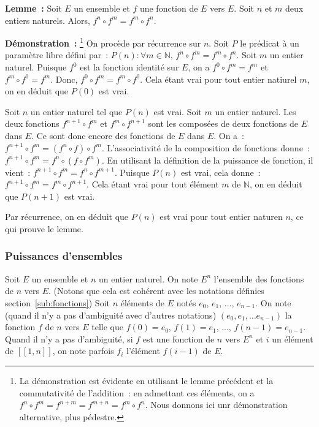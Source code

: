    \done 

\medskip

\noindent\textbf{Lemme :} 
    Soit $E$ un ensemble et $f$ une fonction de $E$ vers $E$.
    Soit $n$ et $m$ deux entiers naturels. 
    Alors, $f^n \circ f^m = f^m \circ f^n$.

\medskip

\noindent\textbf{Démonstration :}%
    \footnote{La démonstration est évidente en utilisant le lemme précédent et la commutativité de l'addition : en admettant ces éléments, on a $f^n \circ f^m = f^{n+m} = f^{m+n} = f^m \circ f^n$.
    Nous donnons ici unr démonstration alternative, plus pédestre.}
    On procède par récurrence sur $n$.
    Soit $P$ le prédicat à un paramètre libre défini par : $P(n): \forall m \in \mathbb{N}, \, f^n \circ f^m = f^m \circ f^n$. 
    Soit $m$ un entier naturel. 
    Puisque $f^0$ est la fonction identité sur $E$, on a $f^0 \circ f^m = f^m$ et $f^m \circ f^0 = f^m$.
    Donc, $f^0 \circ f^m = f^m \circ f^0$. 
    Cela étant vrai pour tout entier natiurel $m$, on en déduit que $P(0)$ est vrai.

    Soit $n$ un entier naturel tel que $P(n)$ est vrai. 
    Soit $m$ un entier naturel. 
    Les deux fonctions $f^{n+1} \circ f^m$ et $f^m \circ f^{n+1}$ sont les composées de deux fonctions de $E$ dans $E$. 
    Ce sont donc encore des fonctions de $E$ dans $E$. 
    On a : $f^{n+1} \circ f^m = (f^n \circ f) \circ f^m$.
    L'associativité de la composition de fonctions donne : $f^{n+1} \circ f^m = f^n \circ (f \circ f^m)$.
    En utilisant la définition de la puissance de fonction, il vient : $f^{n+1} \circ f^m = f^n \circ f^{m+1}$.
    Puisque $P(n)$ est vrai, cela donne : $f^{n+1} \circ f^m = f^m \circ f^{n+1}$. 
    Cela étant vrai pour tout élément $m$ de $\mathbb{N}$, on en déduit que $P(n+1)$ est vrai. 

    Par récurrence, on en déduit que $P(n)$ est vrai pour tout entier naturen $n$, ce qui prouve le lemme.

   \done 

\subsubsection{Puissances d'ensembles}

Soit $E$ un ensemble et $n$ un entier naturel. 
On note $E^n$ l'ensemble des fonctions de $n$ vers $E$. 
(Notons que cela est cohérent avec les notations définies section~\ref{sub:fonctions})
Soit $n$ éléments de $E$ notés $e_0$, $e_1$, ..., $e_{n-1}$. 
On note (quand il n'y a pas d'ambiguité avec d'autres notations) $\left( e_0, e_1, \dots e_{n-1} \right)$ la fonction $f$ de $n$ vers $E$ telle que $f(0) = e_0$, $f(1) = e_1$, ..., $f(n-1) = e_{n-1}$. 
Quand il n'y a pas d'ambiguité, si $f$ est une fonction de $n$ vers $E^{n}$ et $i$ un élément de $[\![1,n]\!]$, on note parfois $f_i$ l'élément $f(i-1)$ de $E$.

